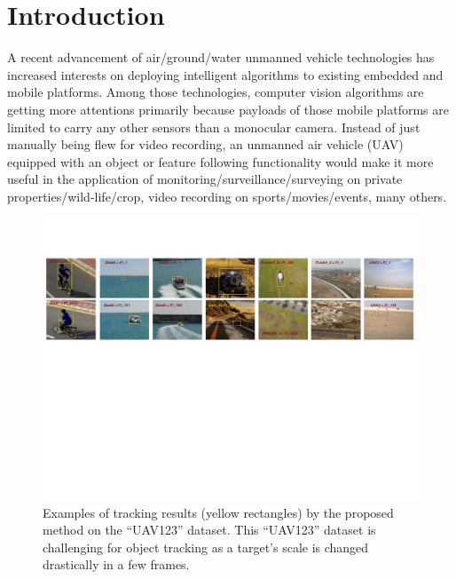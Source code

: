 \documentclass[10pt,twocolumn,letterpaper]{article}
\begin{document}
\section{Introduction}
A recent advancement of air/ground/water unmanned vehicle technologies
has increased interests on deploying intelligent algorithms to
existing embedded and mobile platforms. Among those technologies,
computer vision algorithms are getting more attentions primarily
because payloads of those mobile platforms are limited to carry any
other sensors than a monocular camera. Instead of just manually being
flew for video recording, an unmanned air vehicle (UAV) equipped with
an object or feature following functionality would make it more useful
in the application of monitoring/surveillance/surveying on private
properties/wild-life/crop, video recording on sports/movies/events,
many others.

\begin{figure}[!h]
\centering
\includegraphics[width=\textwidth]{./figures/ResultsIntroduction.pdf}
\caption{Examples of tracking results (yellow rectangles) by the
  proposed method on the ``UAV123'' dataset. This ``UAV123'' dataset
  is challenging for object tracking as a target's scale is changed
  drastically in a few frames.}
\label{ResultsIntroduction}
\end{figure}
\end{document}
